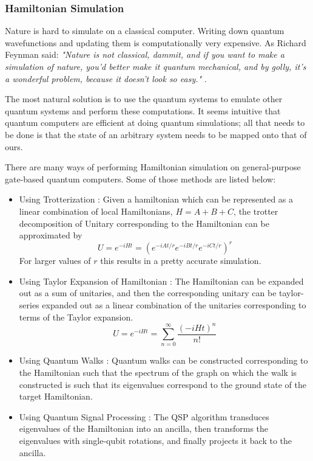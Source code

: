 \subsubsection{Hamiltonian Simulation}

Nature is hard to simulate on a classical computer. Writing down quantum wavefunctions and updating them is computationally very expensive. As Richard Feynman said: \textit{"Nature is not classical, dammit, and if you want to make a simulation of nature, you'd better make it quantum mechanical, and by golly, it's a wonderful problem, because it doesn't look so easy." } \cite{feynman-quantum-simulating-physics}.

The most natural solution is to use the quantum systems to emulate other quantum systems and perform these computations. It seems intuitive that quantum computers are efficient at doing quantum simulations; all that needs to be done is that the state of an arbitrary system needs to be mapped onto that of ours.

There are many ways of performing Hamiltonian simulation on general-purpose gate-based quantum computers. Some of those methods are listed below:
\begin{itemize}
    \item Using Trotterization \cite{method-suzuki-trotter-decomposition}: Given a hamiltonian which can be represented as a linear combination of local Hamiltonians, $H = A + B + C$, the trotter decomposition of Unitary corresponding to the Hamiltonian can be approximated by
    \begin{equation}
        U = e^{-i H t} = (e^{-i A t / r} e^{-i B t / r} e^{-i C t / r})^r
    \end{equation}
    For larger values of $r$ this results in a pretty accurate simulation.
    \item Using Taylor Expansion of Hamiltonian \cite{hamiltonian-sim-methods-taylor}: The Hamiltonian can be expanded out as a sum of unitaries, and then the corresponding unitary can be taylor-series expanded out as a linear combination of the unitaries corresponding to terms of the Taylor expansion.
    \begin{equation}
        U = e^{-i H t} = \sum_{n=0}^{\infty} \frac{(-i H t)^n}{n!}
    \end{equation}
    \item Using Quantum Walks \cite{hamiltonian-sim-methods-qwalks}: Quantum walks can be constructed corresponding to the Hamiltonian such that the spectrum of the graph on which the walk is constructed is such that its eigenvalues correspond to the ground state of the target Hamiltonian.
    \item Using Quantum Signal Processing \cite{hamiltonian-sim-methods-qsp-1,hamiltonian-sim-methods-qsp-2}: The QSP algorithm transduces eigenvalues of the Hamiltonian into an ancilla, then transforms the eigenvalues with single-qubit rotations, and finally projects it back to the ancilla.
\end{itemize}


